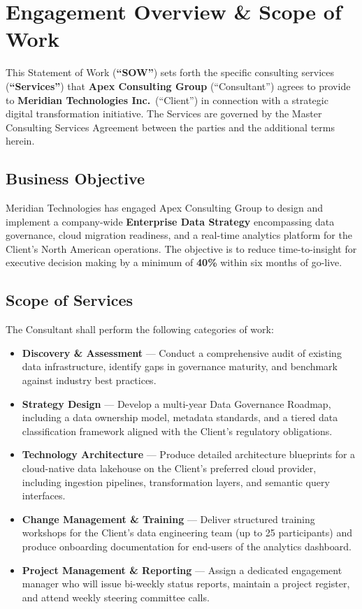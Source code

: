 
\section{Engagement Overview \& Scope of Work}

This Statement of Work (\textbf{``SOW''}) sets forth the specific consulting services
(\textbf{``Services''}) that \textbf{Apex Consulting Group} (``Consultant'') agrees to
provide to \textbf{Meridian Technologies Inc.}\ (``Client'') in connection with a
strategic digital transformation initiative. The Services are governed by the Master
Consulting Services Agreement between the parties and the additional terms herein.

\subsection{Business Objective}

Meridian Technologies has engaged Apex Consulting Group to design and implement a
company-wide \textbf{Enterprise Data Strategy} encompassing data governance, cloud
migration readiness, and a real-time analytics platform for the Client's North
American operations. The objective is to reduce time-to-insight for executive decision
making by a minimum of \textbf{40\%} within six months of go-live.

\subsection{Scope of Services}

The Consultant shall perform the following categories of work:

\begin{itemize}
  \item \textbf{Discovery \& Assessment} --- Conduct a comprehensive audit of existing
    data infrastructure, identify gaps in governance maturity, and benchmark against
    industry best practices.
  \item \textbf{Strategy Design} --- Develop a multi-year Data Governance Roadmap,
    including a data ownership model, metadata standards, and a tiered data classification
    framework aligned with the Client's regulatory obligations.
  \item \textbf{Technology Architecture} --- Produce detailed architecture blueprints for
    a cloud-native data lakehouse on the Client's preferred cloud provider, including
    ingestion pipelines, transformation layers, and semantic query interfaces.
  \item \textbf{Change Management \& Training} --- Deliver structured training workshops
    for the Client's data engineering team (up to 25 participants) and produce
    onboarding documentation for end-users of the analytics dashboard.
  \item \textbf{Project Management \& Reporting} --- Assign a dedicated engagement
    manager who will issue bi-weekly status reports, maintain a project register, and
    attend weekly steering committee calls.
\end{itemize}

